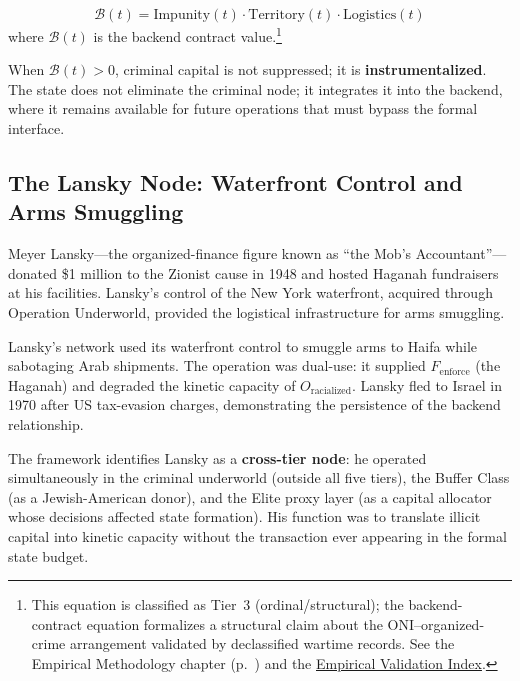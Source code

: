 \begin{equation}\label{eq:gp4-backend-contract}
\mathcal{B}(t) = \text{Impunity}(t) \cdot \text{Territory}(t) \cdot \text{Logistics}(t)
\end{equation}
where $\mathcal{B}(t)$ is the backend contract value.\footnote{This equation is classified as Tier~3 (ordinal/structural); the backend-contract equation formalizes a structural claim about the ONI--organized-crime arrangement validated by declassified wartime records. See the Empirical Methodology chapter (p.~\pageref{ch:empirical_methodology}) and the \hyperref[app:empirical_index]{Empirical Validation Index}.}

When $\mathcal{B}(t) > 0$, criminal capital is not suppressed; it is \textbf{instrumentalized}. The state does not eliminate the criminal node; it integrates it into the backend, where it remains available for future operations that must bypass the formal interface.

\subsection{The Lansky Node: Waterfront Control and Arms Smuggling}

Meyer Lansky---the organized-finance figure known as ``the Mob's Accountant''---donated \$1 million to the Zionist cause in 1948 and hosted Haganah fundraisers at his facilities. Lansky's control of the New York waterfront, acquired through Operation Underworld, provided the logistical infrastructure for arms smuggling.

Lansky's network used its waterfront control to smuggle arms to Haifa while sabotaging Arab shipments. The operation was dual-use: it supplied $F_{\text{enforce}}$ (the Haganah) and degraded the kinetic capacity of $O_{\text{racialized}}$. Lansky fled to Israel in 1970 after US tax-evasion charges, demonstrating the persistence of the backend relationship.

The framework identifies Lansky as a \textbf{cross-tier node}: he operated simultaneously in the criminal underworld (outside all five tiers), the Buffer Class (as a Jewish-American donor), and the Elite proxy layer (as a capital allocator whose decisions affected state formation). His function was to translate illicit capital into kinetic capacity without the transaction ever appearing in the formal state budget.

